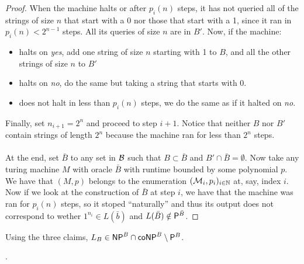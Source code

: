 \begin{proof}
        When the machine halts or after $p_i(n)$ steps,
        it has not queried all of 
        the strings of size $n$ that start with
        a 0 nor those that start with a 1,
        since it ran in $p_i(n) < 2^{n-1}$ steps.
        All its queries of size $n$ are in $B'$.
        Now, if the machine: \begin{itemize}
            \item halts on \textit{yes},
                add one string of size $n$ starting
                with 1 to $B$, and all the other strings of size $n$ to $B'$
            \item halts on \textit{no}, do the same but taking a string
                that starts with 0.
            \item does not halt in less than $p_i(n)$ steps,
                we do the same as if it halted on \textit{no}.
        \end{itemize}
        Finally, set $n_{i+1} = 2^n$ and proceed to step $i+1$. 
        Notice that neither $B$ nor $B'$
        contain strings of length $2^n$ because the machine ran for less than $2^n$
        steps.

        \paragraph{} At the end, set $\bar B$ to any set in $\mathcal B$ such
        that $B \subset \bar B$ and $B' \cap \bar B = \emptyset$.
        Now take any turing machine $M$ with oracle $\bar B$ 
        with runtime bounded by some polynomial $p$. 
        We have that $(M, p)$ belongs to the enumeration $(\mathcal{M}_i, p_i)_{i \in \mathbb N}$
        at, say, index $i$. 
        Now if we look at the construction of $\bar B$ at step $i$, 
        we have that the machine was ran for $p_i(n)$ steps,
        so it stoped ``naturally'' and thus its output does not
        correspond to wether $1^{n_i} \in L(\bar b)$ and $L(\bar B) \notin \mathsf{P}^{\bar B}$.
    \end{proof}

    Using the three claims, $L_B \in \mathsf{NP}^B \cap \mathsf{coNP}^B \setminus \mathsf{P}^B$.

    \printbibliography

    \newpage
    .

